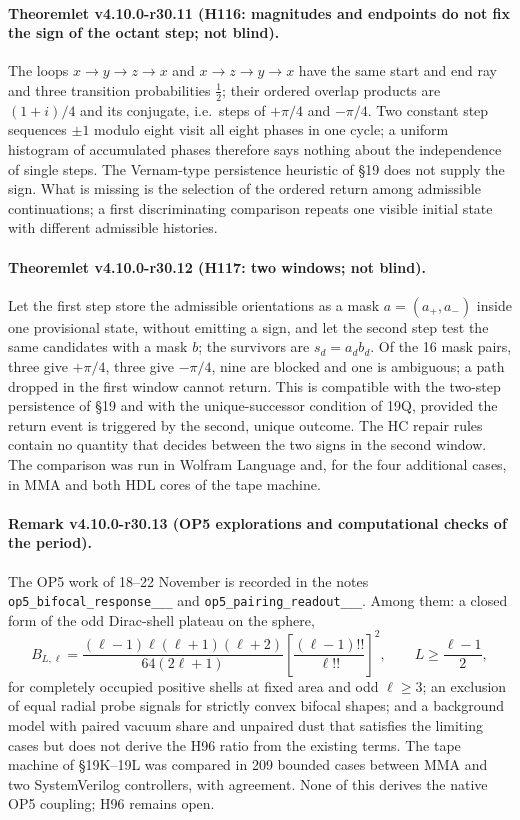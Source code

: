\paragraph{Theoremlet v4.10.0-r30.11 (H116: magnitudes and endpoints do not fix the sign of the octant step; not blind).}
The loops \(x\to y\to z\to x\) and \(x\to z\to y\to x\) have the same start and end ray and three transition probabilities \(\tfrac12\); their ordered
overlap products are \((1+i)/4\) and its conjugate, i.e.\ steps of \(+\pi/4\) and \(-\pi/4\).  Two constant step sequences \(\pm1\) modulo eight visit
all eight phases in one cycle; a uniform histogram of accumulated phases therefore says nothing about the independence of single steps.  The
Vernam-type persistence heuristic of \S19 does not supply the sign.  What is missing is the selection of the ordered return among admissible
continuations; a first discriminating comparison repeats one visible initial state with different admissible histories.

\paragraph{Theoremlet v4.10.0-r30.12 (H117: two windows; not blind).}
Let the first step store the admissible orientations as a mask \(a=(a_+,a_-)\) inside one provisional state, without emitting a sign, and let the
second step test the same candidates with a mask \(b\); the survivors are \(s_d=a_db_d\).  Of the 16 mask pairs, three give \(+\pi/4\), three give
\(-\pi/4\), nine are blocked and one is ambiguous; a path dropped in the first window cannot return.  This is compatible with the two-step
persistence of \S19 and with the unique-successor condition of 19Q, provided the return event is triggered by the second, unique outcome.  The HC
repair rules contain no quantity that decides between the two signs in the second window.  The comparison was run in Wolfram Language and, for the
four additional cases, in MMA and both HDL cores of the tape machine.

\paragraph{Remark v4.10.0-r30.13 (OP5 explorations and computational checks of the period).}
The OP5 work of 18--22 November is recorded in the notes \texttt{op5\_\allowbreak bifocal\_\allowbreak response\_\_\_}
and \texttt{op5\_\allowbreak pairing\_\allowbreak readout\_\_\_}.  Among them: a closed form of the odd Dirac-shell plateau on
the sphere,
\[
B_{L,\ell}=\frac{(\ell-1)\ell(\ell+1)(\ell+2)}{64(2\ell+1)}\left[\frac{(\ell-1)!!}{\ell!!}\right]^2,\qquad L\geq\frac{\ell-1}{2},
\]
for completely occupied positive shells at fixed area and odd \(\ell\geq3\); an exclusion of equal radial probe signals for strictly convex bifocal
shapes; and a background model with paired vacuum share and unpaired dust that satisfies the limiting cases but does not derive the H96 ratio from
the existing terms.  The tape machine of \S19K--19L was compared in 209 bounded cases between MMA and two SystemVerilog controllers, with agreement.
None of this derives the native OP5 coupling; H96 remains open.

